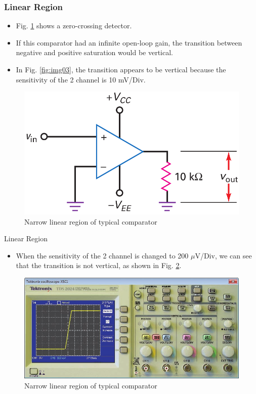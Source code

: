 \documentclass[pdflatex,compress]{beamer}
\begin{document}
\begin{frame}
	\frametitle{Linear Region}
	\begin{multicols}{2}
		\begin{itemize}
			\item Fig. \ref{fig:img08} shows a zero-crossing detector.
			\item If this comparator had an infinite open-loop gain, the transition between negative and positive saturation would be vertical.
			\item In Fig. \ref{fig:img03}, the transition appears to be vertical because the sensitivity of the 2 channel is 10 mV/Div.
		\end{itemize}
		\columnbreak
		\begin{figure}
			\centering
			\includegraphics[width=\linewidth]{img/img08}
			\caption{Narrow linear region of typical comparator}
			\label{fig:img08}
		\end{figure}
	\end{multicols}
\end{frame}

\begin{frame}{Linear Region}
	\begin{itemize}
		\item When the sensitivity of the 2 channel is changed to 200 $\mu$V/Div, we can see that the transition is not vertical, as shown in Fig. \ref{fig:img09}.
	\end{itemize}
	\begin{figure}
		\centering
		\includegraphics[width=0.8\linewidth]{img/img09}
		\caption{Narrow linear region of typical comparator}
		\label{fig:img09}
	\end{figure}
\end{frame}
\end{document}
